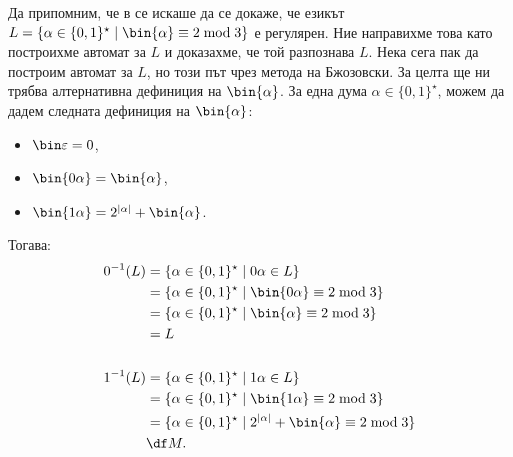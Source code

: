 \begin{example}
  Да припомним, че в  се искаше да се докаже, че езикът 
  $L = \{\alpha \in \{0,1\}^\star \mid \bin{\alpha} \equiv 2 \bmod 3\}$ е регулярен.
  Ние направихме това като построихме автомат за $L$ и доказахме, че той разпознава $L$.
  Нека сега пак да построим автомат за $L$, но този път чрез метода на Бжозовски.
  За целта ще ни трябва алтернативна дефиниция на $\bin{\alpha}$.
  За една дума $\alpha \in \{0,1\}^\star$, можем да дадем следната дефиниция на $\bin{\alpha}$:
  \begin{itemize}
  \item
    $\bin\varepsilon = 0$,
  \item
    $\bin{0\alpha} = \bin{\alpha}$,
  \item
    $\bin{1\alpha} = 2^{|\alpha|} + \bin{\alpha}$.
  \end{itemize}
  Тогава:
\begin{align*}
  0^{-1}(L) & = \{\alpha \in \{0,1\}^\star \mid 0\alpha \in L\}\\
            & = \{\alpha \in \{0,1\}^\star \mid \bin{0\alpha} \equiv 2 \bmod 3\}\\
            & = \{\alpha \in \{0,1\}^\star \mid \bin{\alpha} \equiv 2 \bmod 3\}\\
            & = L\\
  \\
  1^{-1}(L) & = \{\alpha \in \{0,1\}^\star \mid 1\alpha \in L\}\\
            & = \{\alpha \in \{0,1\}^\star \mid \bin{1\alpha} \equiv 2 \bmod 3\}\\
            & = \{\alpha \in \{0,1\}^\star \mid 2^{|\alpha|} + \bin{\alpha} \equiv 2 \bmod 3\}\\
            & \df M.
\end{align*}


\end{example}
